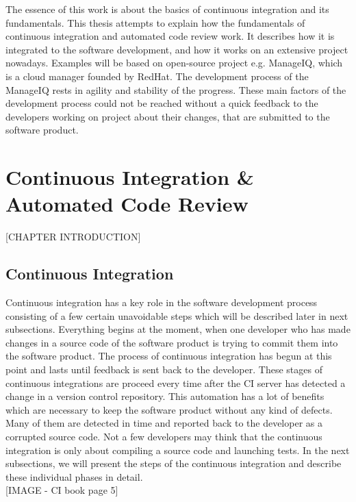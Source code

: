 The essence of this work is about the basics of continuous integration and its fundamentals. This thesis attempts to explain how the fundamentals of continuous integration and automated code review work. It describes how it is integrated to the software development, and how it works on an extensive project nowadays. Examples will be based on open-source project e.g. ManageIQ, which is a cloud manager founded by RedHat. The development process of the ManageIQ rests in agility and stability of the progress. These main factors of the development process could not be reached without a quick feedback to the developers working on project about their changes, that are submitted to the software product.

\chapter{Continuous Integration \& Automated Code Review}

[CHAPTER INTRODUCTION]

\section{Continuous Integration}
Continuous integration has a key role in the software development process consisting of a few certain unavoidable steps which will be described later in next subsections. Everything begins at the moment, when one developer who has made changes in a source code of the software product is trying to commit them into the software product. The process of continuous integration has begun at this point and lasts until feedback is sent back to the developer. These stages of continuous integrations are proceed every time after the CI server has detected a change in a version control repository. This automation has a lot of benefits which are necessary to keep the software product without any kind of defects. Many of them are detected in time and reported back to the developer as a corrupted source code. Not a few developers may think that the continuous integration is only about compiling a source code and launching tests. In the next subsections, we will present the steps of the continuous integration and describe these individual phases in detail.\\

[IMAGE - CI book page 5]

